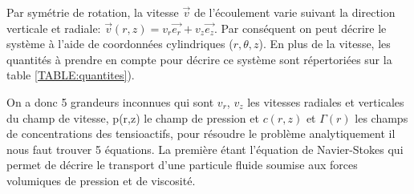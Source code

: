 \documentclass[french, 10pt]{article}
\begin{document}
\begin{minipage}[c]{0.4\linewidth}

    \centering
    \label{TABLE:quantites}
    
    \resizebox{1\linewidth}{!}{}
    \label{fig:SketchPrincipe}
\end{minipage}

Par symétrie de rotation, la vitesse $\vec{v}$ de l'écoulement varie suivant la direction verticale et radiale: $\vec{v}(r,z)=v_r\vec{e_r}+v_{z}\vec{e_z}$. Par conséquent on peut décrire le système à l'aide de coordonnées cylindriques ($r,\theta,z$). En plus de la vitesse, les quantités à prendre en compte pour décrire ce système sont répertoriées sur la table \ref{TABLE:quantites}).\medskip

On a donc 5 grandeurs inconnues qui sont $v_r$, $v_z$ les vitesses radiales et verticales du champ de vitesse, p(r,z) le champ de pression et $c(r,z)$ et $\Gamma(r)$ les champs de concentrations des tensioactifs, pour résoudre le problème analytiquement il nous faut trouver 5 équations. La première étant l'équation de Navier-Stokes qui permet de décrire le transport d'une particule fluide soumise aux forces volumiques de pression et de viscosité. 
\end{document}
